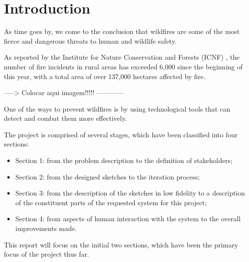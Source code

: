 \chapter{Introduction} \label{intro}
As time goes by, we come to the conclusion that wildfires are 
some of the most fierce and dangerous threats to human and 
wildlife safety. \par
As reported by the Institute for Nature Conservation and Forests (ICNF) , the number of fire incidents in rural areas has exceeded 6,000 since the beginning of this year, with a total area of over 137,000 hectares affected by fire. \par
-----> Colocar aqui imagem!!!!! ------------ \par
\par
One of the ways to prevent wildfires is by using 
technological tools that can detect and combat them more 
effectively. \par 
The project is comprised of several stages, which have been classified into four sections: \par
\begin{itemize}
    \item Section 1: from the problem description to the 
    definition of stakeholders;
    \item Section 2: from the designed sketches to the iteration 
    process;
    \item Section 3: from the description of the sketches in low fidelity 
    to a description of the constituent parts of the requested 
    system for this project; 
    \item Section 4: from aspects of human interaction with the 
    system to the overall improvements made.
\end{itemize}
This report will focus on the initial two sections, which have been the primary focus of the project thus far.

